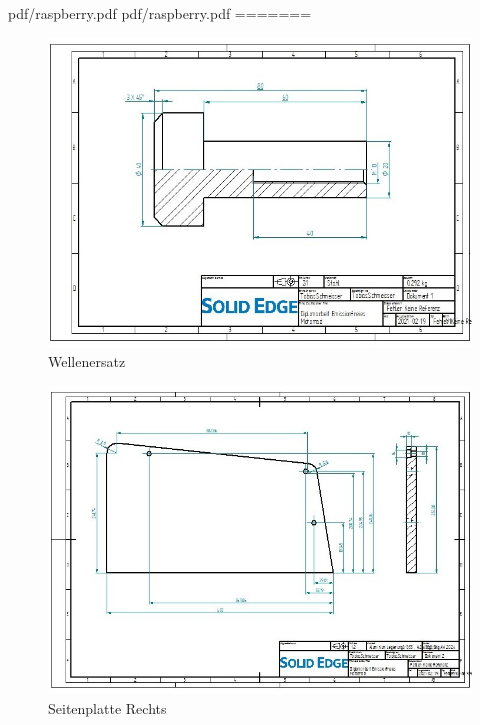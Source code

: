  {pdf/raspberry.pdf}
 {pdf/raspberry.pdf}
=======
\begin{figure} [H]
	\begin{center}
		\includegraphics[angle=90] {figures/mechanik/Welle_Rechts_Zeichnung.jpg}
			\caption{Wellenersatz}
			\label{fig:Wellenersatz}
	\end{center}
\end{figure}


\begin{figure} [H]
	\begin{center}
		\includegraphics[angle=90]{figures/mechanik/Seitenplatte_Fertigung_Rechts.jpg}
			\caption{Seitenplatte Rechts}
			\label{fig:Seitenplatte Rechts}
	\end{center}
\end{figure}



